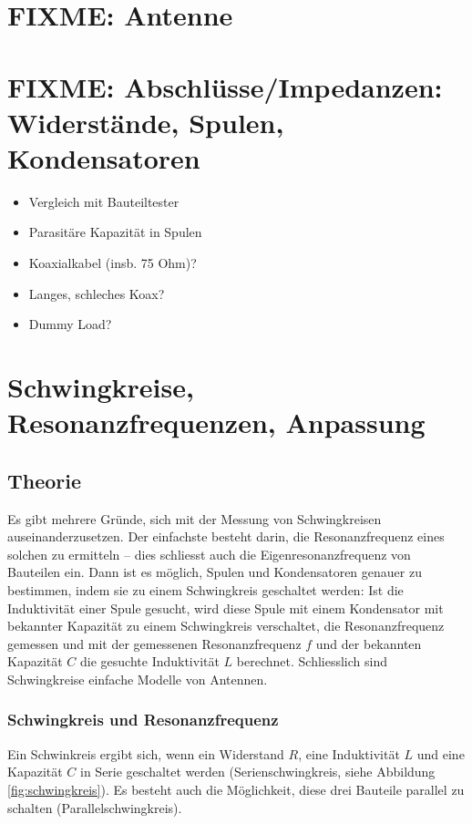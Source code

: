 \documentclass[twoside,a4paper,11pt,halfparskip,DIV=11,notitlepage]{scrartcl}
\begin{document}
\section{FIXME: Antenne}

\section{FIXME: Abschlüsse/Impedanzen: Widerstände, Spulen, Kondensatoren}
\begin{itemize}
    \item Vergleich mit Bauteiltester
    \item Parasitäre Kapazität in Spulen
    \item Koaxialkabel (insb. 75 Ohm)?
    \item Langes, schleches Koax?
    \item Dummy Load?
\end{itemize}

\newpage %
\section{Schwingkreise, Resonanzfrequenzen, Anpassung}\label{sec:schwingkreis}
\subsection{Theorie}
Es gibt mehrere Gründe, sich mit der Messung von Schwingkreisen
auseinanderzusetzen. Der einfachste besteht darin, die Resonanzfrequenz
eines solchen zu ermitteln -- dies schliesst auch die Eigenresonanzfrequenz von
Bauteilen ein. Dann ist es möglich, Spulen und Kondensatoren genauer zu
bestimmen, indem sie zu einem Schwingkreis geschaltet werden: Ist die
Induktivität einer Spule gesucht, wird diese Spule mit einem Kondensator
mit bekannter Kapazität zu einem Schwingkreis verschaltet, die Resonanzfrequenz
gemessen und mit der gemessenen Resonanzfrequenz $f$ und der bekannten
Kapazität $C$ die gesuchte Induktivität $L$ berechnet. Schliesslich sind
Schwingkreise einfache Modelle von Antennen.

\subsubsection{Schwingkreis und Resonanzfrequenz}
Ein Schwinkreis ergibt sich, wenn ein Widerstand $R$, eine Induktivität $L$
und eine Kapazität $C$ in Serie geschaltet werden (Serienschwingkreis, siehe
Abbildung \ref{fig:schwingkreis}). Es besteht auch die Möglichkeit, diese drei
Bauteile parallel zu schalten (Parallelschwingkreis).
\end{document}
